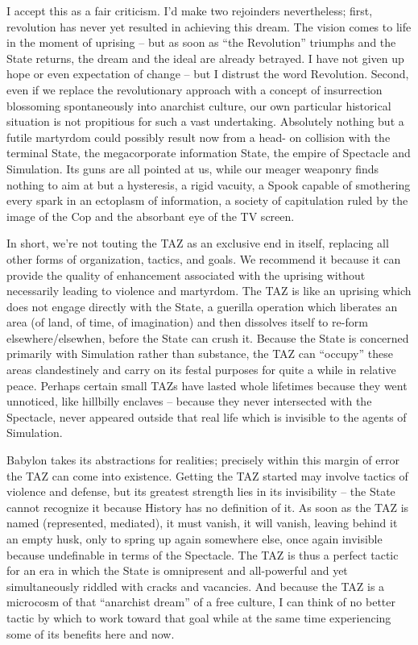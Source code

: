 \documentclass[a4paper,english,10pt,twoside]{article}
\begin{document}
\medskip
I accept this as a fair criticism. I'd make two rejoinders nevertheless; first, revolution has never yet resulted in achieving this dream. The vision comes to life in the moment of uprising -- but as soon as \enquote{the Revolution} triumphs and the State returns, the dream and the ideal are already betrayed. I have not given up hope or even expectation of change -- but I distrust the word Revolution. Second, even if we replace the revolutionary approach with a concept of insurrection blossoming spontaneously into anarchist culture, our own particular historical situation is not propitious for such a vast undertaking. Absolutely nothing but a futile martyrdom could possibly result now from a head- on collision with the terminal State, the megacorporate information State, the empire of Spectacle and Simulation. Its guns are all pointed at us, while our meager weaponry finds nothing to aim at but a hysteresis, a rigid vacuity, a Spook capable of smothering every spark in an ectoplasm of information, a society of capitulation ruled by the image of the Cop and the absorbant eye of the TV screen.

\medskip
In short, we're not touting the TAZ as an exclusive end in itself, replacing all other forms of organization, tactics, and goals. We recommend it because it can provide the quality of enhancement associated with the uprising without necessarily leading to violence and martyrdom. The TAZ is like an uprising which does not engage directly with the State, a guerilla operation which liberates an area (of land, of time, of imagination) and then dissolves itself to re-form elsewhere/elsewhen, before the State can crush it. Because the State is concerned primarily with Simulation rather than substance, the TAZ can \enquote{occupy} these areas clandestinely and carry on its festal purposes for quite a while in relative peace. Perhaps certain small TAZs have lasted whole lifetimes because they went unnoticed, like hillbilly enclaves -- because they never intersected with the Spectacle, never appeared outside that real life which is invisible to the agents of Simulation.

\medskip
Babylon takes its abstractions for realities; precisely within this margin of error the TAZ can come into existence. Getting the TAZ started may involve tactics of violence and defense, but its greatest strength lies in its invisibility -- the State cannot recognize it because History has no definition of it. As soon as the TAZ is named (represented, mediated), it must vanish, it will vanish, leaving behind it an empty husk, only to spring up again somewhere else, once again invisible because undefinable in terms of the Spectacle. The TAZ is thus a perfect tactic for an era in which the State is omnipresent and all-powerful and yet simultaneously riddled with cracks and vacancies. And because the TAZ is a microcosm of that \enquote{anarchist dream} of a free culture, I can think of no better tactic by which to work toward that goal while at the same time experiencing some of its benefits here and now.
\end{document}
